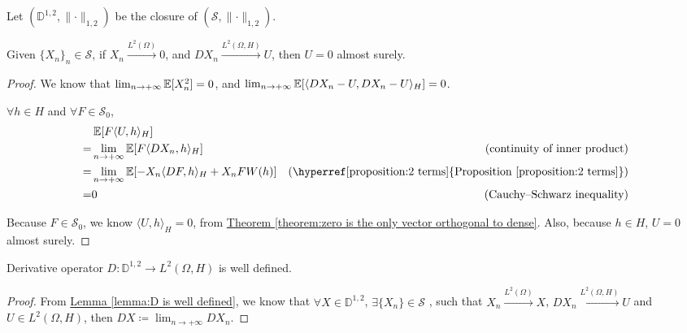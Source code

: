 \begin{notation}
Let $(\mathbb{D}^{1, 2}, \lVert \cdot \rVert_{1, 2})$ 
be the closure of $(\mathcal{S}, \lVert \cdot \rVert_{1, 2})$. 
\end{notation}

\begin{lemma}
\label{lemma:D is well defined}
Given $\{X_n\}_n \in \mathcal{S}$, 
if $X_n \xrightarrow{L^2(\Omega)} 0$, 
and $DX_n \xrightarrow{L^2(\Omega, H)} U$, 
then $U = 0$ almost surely.
\end{lemma}

\begin{proof}
We know that $\lim_{n \to +\infty} \operatorname{\mathbb{E}}[X_n^2] = 0$, 
and $\lim_{n \to +\infty} 
\operatorname{\mathbb{E}}[ \langle DX_n - U , DX_n - U \rangle_{H} ] = 0$. 

$\forall h \in H$ and $\forall F \in \mathcal{S}_{0}$,  
\begin{equation*}
\begin{aligned}
&\E[F \langle U, h \rangle_{H}]  \\
= &\lim_{n \to +\infty} \E[F \langle DX_n, h \rangle_{H}]
&\text{(continuity of inner product)} \\
= &\lim_{n \to +\infty} 
\E[- X_n \langle DF, h \rangle_{H}
+ X_n F W(h)]
&\text{(\hyperref[proposition:2 terms]
{Proposition \ref*{proposition:2 terms}})} \\
= & 0
&\text{(Cauchy–Schwarz inequality)} \\
\end{aligned}
\end{equation*}

Because $F \in \mathcal{S}_{0}$, we know $\langle U, h \rangle_{H} = 0$, 
from \hyperref[theorem:zero is the only vector orthogonal to dense]
{Theorem \ref*{theorem:zero is the only vector orthogonal to dense}}. 
Also, because $h \in H$, $U = 0$ almost surely. 
\end{proof}

\begin{theorem}
Derivative operator $D: \mathbb{D}^{1, 2} \to L^2(\Omega, H)$ is well defined.  
\end{theorem}

\begin{proof}
From \hyperref[lemma:D is well defined]
{Lemma \ref*{lemma:D is well defined}}, 
we know that $\forall X \in \mathbb{D}^{1, 2}$, $\exists \{X_n\} \in \mathcal{S}$
, such that $X_n \xrightarrow{L^2(\Omega)} X$,
$DX_n \xrightarrow{L^2(\Omega, H)} U$
and $U \in L^2(\Omega, H)$, then $DX \coloneqq \lim_{n \to +\infty} DX_n$. 
\end{proof}

